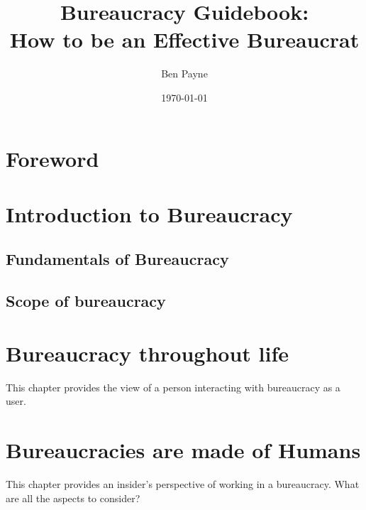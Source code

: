 \documentclass{book}
\title{Bureaucracy Guidebook: \\How to be an Effective Bureaucrat}
\author{Ben Payne}
\date{\today}
\begin{document}
\maketitle
\frontmatter %



\chapter*{Foreword}%


\tableofcontents

\mainmatter %



\chapter{Introduction to Bureaucracy}

\section{Fundamentals of Bureaucracy}







\section{Scope of bureaucracy}


\chapter{Bureaucracy throughout life}
This chapter provides the view of a person interacting with bureaucracy as a user. 




\chapter{Bureaucracies are made of Humans}
This chapter provides an insider's perspective of working in a bureaucracy. What are all the aspects to consider?
\end{document}
